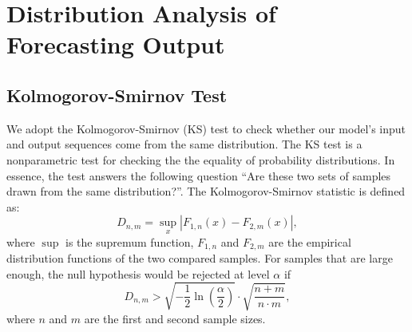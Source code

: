 \documentclass{article}
\begin{document}
\begin{table*}[h]
\centering
\caption{Noise injection studies. A 0.3*$\mathcal{N}\left(0,1\right)$ Gaussian noise is introduced into our training/testing. We conduct 4 sets of experiments with/without noise in training and test phases. The experiments are performed on ETTm1 and Electricity with different output lengths. The metric of variants is presented in relative value ('+' indicates degraded performance, and '-' indicates improved performance).}
\end{table*}
%
  \section{Distribution Analysis of Forecasting Output}
\label{app:Distribution}
\subsection{Kolmogorov-Smirnov Test}
We adopt the Kolmogorov-Smirnov (KS) test to check whether our model's input and output sequences come from the same distribution. The KS test is a nonparametric test for checking the the equality of probability distributions. In essence, the test answers the following question ``Are these two sets of samples drawn from the same distribution?''. 
The Kolmogorov-Smirnov statistic is defined as:
$$
D_{n, m}=\sup _{x}\left|F_{1, n}(x)-F_{2, m}(x)\right|, 
$$
where $\sup$ is the supremum function, $F_{1, n}$ and $F_{2, m}$ are the empirical distribution functions of the two compared samples.
For samples that are large enough, the null hypothesis would be rejected at level $\alpha$ if
$$
D_{n, m}>\sqrt{-\frac{1}{2}\ln \left(\frac{\alpha}{2}\right)} \cdot \sqrt{\frac{n+m}{n \cdot m}},
$$
where $n$ and $m$ are the first and second sample sizes.
\end{document}
